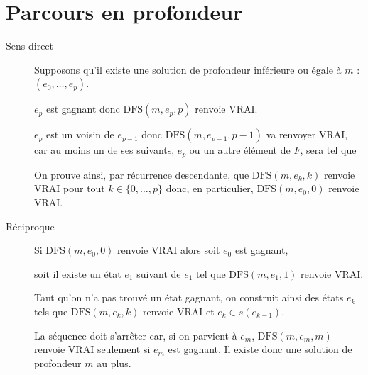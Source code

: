 \section{Parcours en profondeur}
\begin{Exercise}[label=exo:dfs]
\begin{description}
\item[Sens direct] 
Supposons qu'il existe une solution de profondeur inférieure ou égale à $m$ : $(e_0,\dots,e_p)$.

$e_p$ est gagnant donc $\text{DFS}(m,e_{p},p)$ renvoie VRAI.

$e_p$ est un voisin de $e_{p-1}$ donc $\text{DFS}(m,e_{p-1},p-1)$ va renvoyer VRAI, car au moins un de ses suivants, $e_p$ ou un autre élément de $F$, sera tel que 

On prouve ainsi, par récurrence descendante, que $\text{DFS}(m,e_k,k)$ renvoie VRAI pour tout $k\in \{0, \ldots, p\}$ donc, en particulier, $\text{DFS}(m,e_0,0)$ renvoie VRAI.

\item[Réciproque] 

Si $\text{DFS}(m,e_0,0)$ renvoie VRAI alors  soit $e_0$ est gagnant, 

soit il existe un état $e_1$ suivant de $e_1$ tel que $\text{DFS}(m,e_1,1)$ renvoie VRAI.

Tant qu'on n'a pas trouvé un état gagnant, on construit ainsi des états $e_k$ tels que $\text{DFS}(m,e_k,k)$ renvoie VRAI et $e_k\in s(e_{k-1})$.

La séquence doit s'arrêter car, si on parvient à $e_m$, $\text{DFS}(m,e_m,m)$ renvoie VRAI seulement si $e_m$ est gagnant. Il existe donc une solution de profondeur $m$ au plus.
\end{description}
\end{Exercise}

